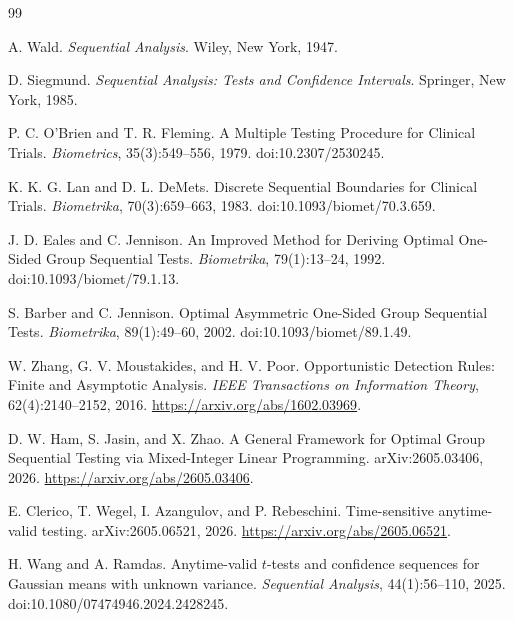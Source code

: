 \documentclass[11pt]{article}
\numberwithin{equation}{section}
\theoremstyle{plain}
\theoremstyle{definition}
\theoremstyle{remark}
\begin{document}
\begin{thebibliography}{99}\sloppy

A. Wald.
\newblock \emph{Sequential Analysis}.
\newblock Wiley, New York, 1947.

D. Siegmund.
\newblock \emph{Sequential Analysis: Tests and Confidence Intervals}.
\newblock Springer, New York, 1985.

P. C. O'Brien and T. R. Fleming.
\newblock A Multiple Testing Procedure for Clinical Trials.
\newblock \emph{Biometrics}, 35(3):549--556, 1979.
\newblock doi:10.2307/2530245.

K. K. G. Lan and D. L. DeMets.
\newblock Discrete Sequential Boundaries for Clinical Trials.
\newblock \emph{Biometrika}, 70(3):659--663, 1983.
\newblock doi:10.1093/biomet/70.3.659.

J. D. Eales and C. Jennison.
\newblock An Improved Method for Deriving Optimal One-Sided Group Sequential Tests.
\newblock \emph{Biometrika}, 79(1):13--24, 1992.
\newblock doi:10.1093/biomet/79.1.13.

S. Barber and C. Jennison.
\newblock Optimal Asymmetric One-Sided Group Sequential Tests.
\newblock \emph{Biometrika}, 89(1):49--60, 2002.
\newblock doi:10.1093/biomet/89.1.49.

W. Zhang, G. V. Moustakides, and H. V. Poor.
\newblock Opportunistic Detection Rules: Finite and Asymptotic Analysis.
\newblock \emph{IEEE Transactions on Information Theory}, 62(4):2140--2152, 2016.
\newblock \url{https://arxiv.org/abs/1602.03969}.

D. W. Ham, S. Jasin, and X. Zhao.
\newblock A General Framework for Optimal Group Sequential Testing via Mixed-Integer Linear Programming.
\newblock arXiv:2605.03406, 2026.
\newblock \url{https://arxiv.org/abs/2605.03406}.

E. Clerico, T. Wegel, I. Azangulov, and P. Rebeschini.
\newblock Time-sensitive anytime-valid testing.
\newblock arXiv:2605.06521, 2026.
\newblock \url{https://arxiv.org/abs/2605.06521}.

H. Wang and A. Ramdas.
\newblock Anytime-valid $t$-tests and confidence sequences for Gaussian means with unknown variance.
\newblock \emph{Sequential Analysis}, 44(1):56--110, 2025.
\newblock doi:10.1080/07474946.2024.2428245.


\end{thebibliography}
\end{document}
